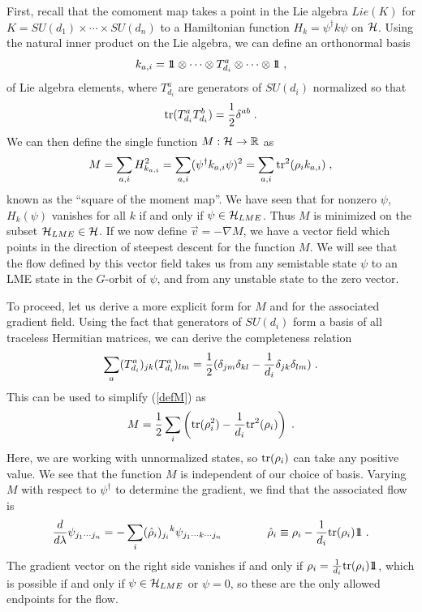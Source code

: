 \documentclass[12pt]{article}
\theoremstyle{definition}
\newcommand{\be}{\begin{equation}}
\newcommand{\ee}{\end{equation}}
\def\identity{{\rlap{1} \hskip 1.6pt \hbox{1}}}
\newcommand{\tr}{{\rm tr}}
\begin{document}
First, recall that the comoment map takes a point in the Lie algebra $Lie(K)$ for $K = SU(d_1) \times \cdots \times SU(d_n)$ to a Hamiltonian function $H_k = \psi^\dagger k \psi$ on ${\cal H}$. Using the natural inner product on the Lie algebra, we can define an orthonormal basis
\be
k_{a,i} = \identity \otimes \cdots \otimes T_{d_i}^a \otimes \cdots \otimes \identity \; ,
\ee
of Lie algebra elements, where $T^a_{d_i}$ are generators of $SU(d_i)$ normalized so that
\be
\tr(T^a_{d_i} T^b_{d_i}) = {1 \over 2} \delta^{a b} \; .
\ee
We can then define the single function $M : {\cal H} \to \mathbb{R}$ as
\be
\label{defM}
M = \sum_{a,i} H^2_{k_{a,i}} = \sum_{a,i} (\psi^\dagger k_{a,i} \psi)^2 = \sum_{a,i} \tr^2(\rho_i k_{a,i})   \; ,
\ee
known as the ``square of the moment map''. We have seen that for nonzero $\psi$, $H_k(\psi)$ vanishes for all $k$ if and only if $\psi \in {\cal H}_{LME}$. Thus $M$ is minimized on the subset ${\cal H}_{LME} \in {\cal H}$. If we now define $\vec{v} = -\nabla M$, we have a vector field which points in the direction of steepest descent for the function $M$. We will see that the flow defined by this vector field takes us from any semistable state $\psi$ to an LME state in the $G$-orbit of $\psi$, and from any unstable state to the zero vector.

To proceed, let us derive a more explicit form for $M$ and for the associated gradient field. Using the fact that generators of $SU(d_i)$ form a basis of all traceless Hermitian matrices, we can derive the completeness relation
\be
\sum_a (T^a_{d_i})_{jk} (T^a_{d_i})_{lm} = {1 \over 2} (\delta_{jm} \delta_{kl} - {1 \over d_i} \delta_{jk} \delta_{lm}) \; .
\ee
This can be used to simplify (\ref{defM}) as
\be
M = {1 \over 2} \sum_{i} \left(\tr(\rho_i^2) - {1 \over d_i} \tr^2(\rho_i)\right) \; .
\ee
Here, we are working with unnormalized states, so $\tr(\rho_i)$ can take any positive value. We see that the function $M$ is independent of our choice of basis. Varying $M$ with respect to $\psi^\dagger$ to determine the gradient, we find that the associated flow is
\be
\label{gradflow}
{d \over d \lambda} \psi_{j_1 \cdots j_n}  = - \sum_i  (\hat{\rho}_i)_{j_i} {}^{k} \psi_{j_1 \cdots k \cdots j_n} \qquad \qquad \hat{\rho}_i \equiv \rho_i - {1 \over d_i} \tr(\rho_i) \identity \; .
\ee
The gradient vector on the right side vanishes if and only if $\rho_i = {1 \over d_i} \tr(\rho_i) \identity$, which is possible if and only if $\psi \in {\cal H}_{LME}$ or $\psi = 0$, so these are the only allowed endpoints for the flow.
\end{document}
